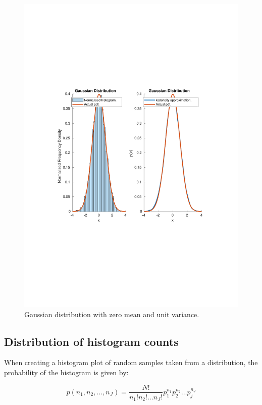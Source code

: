 \documentclass[12pt]{article}
\begin{document}
\begin{figure}[!htb]
\includegraphics[width=\textwidth]{figures/gaussian-pdf.pdf}
  \caption{Gaussian distribution with zero mean and unit variance.}
  \label{fig:gaussian-pdf}
\end{figure}

\subsection{Distribution of histogram counts}

When creating a histogram plot of random samples taken from a distribution, the probability of the histogram is given by:

\begin{equation}
    p(n_1, n_2, \ldots, n_J) = \frac {N!} {n_1! n_2! \ldots n_J!} p_1^{n_1} p_2^{n_2} \ldots p_j^{n_J}
\end{equation}
\end{document}
